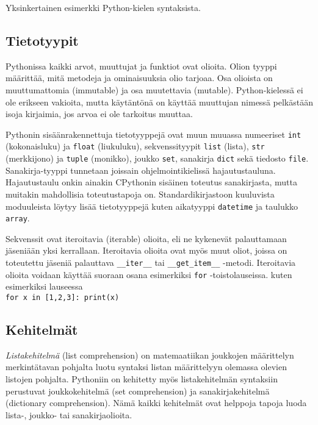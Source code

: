 \documentclass[finnish]{tktltiki2}
\theoremstyle{definition}
\theoremstyle{remark}
\begin{document}
\begin{listing}[ht]
    \inputminted[linenos,frame=single,framesep=10pt]{python}{code/foo.py}
    \caption{Yksinkertainen esimerkki Python-kielen syntaksista.}
    \label{lst:ex1}
\end{listing}

\subsection{Tietotyypit}

Pythonissa kaikki arvot, muuttujat ja funktiot ovat olioita. Olion tyyppi määrittää, mitä metodeja ja ominaisuuksia olio tarjoaa. Osa olioista on muuttumattomia (immutable) ja osa muutettavia (mutable). Python-kielessä ei ole erikseen vakioita, mutta käytäntönä on käyttää muuttujan nimessä pelkästään isoja kirjaimia, jos arvoa ei ole tarkoitus muuttaa.

Pythonin sisäänrakennettuja tietotyyppejä ovat muun muuassa numeeriset \verb|int| (kokonaisluku) ja \verb|float| (liukuluku), sekvenssityypit \verb|list| (lista), \verb|str| (merkkijono) ja \verb|tuple| (monikko), joukko \verb|set|, sanakirja \verb|dict| sekä tiedosto \verb|file|. Sanakirja-tyyppi tunnetaan joissain ohjelmointikielissä hajautustauluna. Hajautustaulu onkin ainakin CPythonin sisäinen toteutus sanakirjasta, mutta muitakin mahdollisia toteutustapoja on. Standardikirjastoon kuuluvista moduuleista löytyy lisää tietotyyppejä kuten aikatyyppi \verb|datetime| ja taulukko \verb|array|.

Sekvenssit ovat iteroitavia (iterable) olioita, eli ne kykenevät palauttamaan jäseniään yksi kerrallaan. Iteroitavia olioita ovat myös muut oliot, joissa on toteutettu jäseniä palauttava \verb|__iter__| tai \verb|__get_item__| -metodi. Iteroitavia olioita voidaan käyttää suoraan osana esimerkiksi \verb|for| -toistolauseissa. kuten esimerkiksi lauseessa 
\\\lstinline|for x in [1,2,3]: print(x)|



\subsection{Kehitelmät}

\emph{Listakehitelmä} (list comprehension) on matemaatiikan joukkojen määrittelyn merkintätavan pohjalta luotu syntaksi listan määrittelyyn olemassa olevien listojen pohjalta. Pythoniin on kehitetty myös listakehitelmän syntaksiin perustuvat joukkokehitelmä (set comprehension) ja sanakirjakehitelmä (dictionary comprehension). Nämä kaikki kehitelmät ovat helppoja tapoja luoda lista-, joukko- tai sanakirjaolioita.
\end{document}
